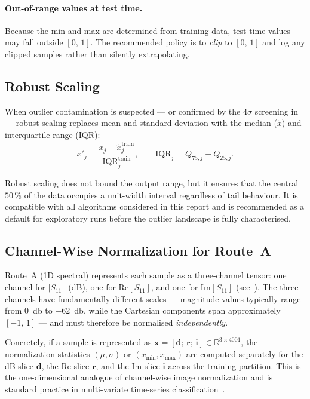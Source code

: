 \paragraph{Out-of-range values at test time.}
Because the min and max are determined from training data, test-time
values may fall outside $[0,\,1]$.  The recommended policy is to
\emph{clip} to $[0,\,1]$ and log any clipped samples rather than
silently extrapolating.

\subsection{Robust Scaling}
\label{sec:norm:robust}

When outlier contamination is suspected — or confirmed by the $4\sigma$
screening in  — robust scaling replaces mean and
standard deviation with the median ($\tilde{x}$) and interquartile range
(IQR):
\begin{equation}
  x'_j = \frac{x_j - \tilde{x}_j^{\text{train}}}
               {\text{IQR}_j^{\text{train}}},
  \qquad
  \text{IQR}_j = Q_{75,j} - Q_{25,j}.
  \label{eq:robust}
\end{equation}

Robust scaling does not bound the output range, but it ensures that the
central $50\,\%$ of the data occupies a unit-width interval regardless
of tail behaviour.  It is compatible with all algorithms considered in
this report and is recommended as a default for exploratory runs before
the outlier landscape is fully characterised.

\subsection{Channel-Wise Normalization for Route~A}
\label{sec:norm:channelwise}

Route~A (1D spectral) represents each sample as a three-channel tensor:
one channel for $|S_{11}|$~(dB), one for $\text{Re}[S_{11}]$, and one
for $\text{Im}[S_{11}]$ (see~).
The three channels have fundamentally different scales --- magnitude
values typically range from \SI{0}{\decibel} to \SI{-62}{\decibel},
while the Cartesian components span approximately $[-1,\,1]$ --- and
must therefore be normalised \emph{independently}.

Concretely, if a sample is represented as
$\mathbf{x} = [\mathbf{d};\,\mathbf{r};\,\mathbf{i}] \in \mathbb{R}^{3 \times 4001}$,
the normalization statistics $(\mu,\sigma)$ or $(x_{\min},x_{\max})$ are
computed separately for the dB slice $\mathbf{d}$, the Re slice
$\mathbf{r}$, and the Im slice $\mathbf{i}$ across the training
partition.  This is the one-dimensional analogue of channel-wise image
normalization and is standard practice in multi-variate time-series
classification~\cite{goodfellow2016deep}.


